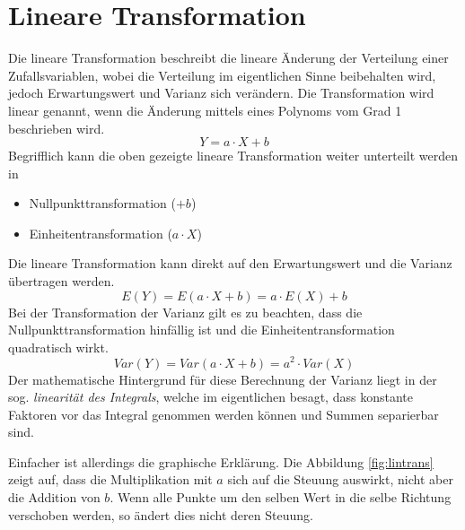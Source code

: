\section{Lineare Transformation}
Die lineare Transformation beschreibt die lineare Änderung
der Verteilung einer Zufallsvariablen, wobei die Verteilung
im eigentlichen Sinne beibehalten wird, jedoch Erwartungswert
und Varianz sich verändern. Die Transformation wird linear
genannt, wenn die Änderung mittels eines Polynoms vom 
Grad 1 beschrieben wird.
\[  
	Y = a \cdot X + b
\]
Begrifflich kann die oben gezeigte lineare Transformation weiter
unterteilt werden in 
\begin{itemize}
	\item Nullpunkttransformation \hfill{} ($+b$)
	\item Einheitentransformation \hfill{} ($a \cdot X$)
\end{itemize}

Die lineare Transformation kann direkt auf den Erwartungswert
und die Varianz übertragen werden.
\[  
	E(Y) = E(a \cdot X + b) = a \cdot E(X) + b
\]
Bei der Transformation der Varianz gilt es zu beachten, dass
die Nullpunkttransformation hinfällig ist und die
Einheitentransformation quadratisch wirkt.
\[  
	Var(Y) = Var(a \cdot X +b) = a^2 \cdot Var(X)
\]
Der mathematische Hintergrund für diese Berechnung der Varianz
liegt in der sog. \emph{linearität des Integrals}, welche im 
eigentlichen besagt, dass konstante Faktoren vor das Integral
genommen werden können und Summen separierbar sind.

Einfacher ist allerdings die graphische Erklärung. Die Abbildung
\ref{fig:lintrans} zeigt auf, dass die Multiplikation mit $a$ 
sich auf die Steuung auswirkt, nicht aber die Addition von $b$. 
Wenn alle Punkte um den selben Wert in die selbe Richtung 
verschoben werden, so ändert dies nicht deren Steuung.



